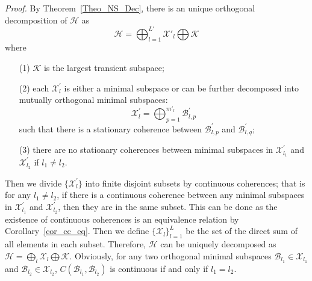 \documentclass[journal]{IEEEtran}
\def\h{\ensuremath{\mathcal{H}}}
\def\k{\ensuremath{\mathcal{K}}}
\def\x{\ensuremath{\mathcal{X}}}
\def\b{\ensuremath{\mathcal{B}}}
\def\k{\mathcal{K}}
\begin{document}
{\it Proof.} By Theorem~\ref{Theo_NS_Dec}, there is an unique  orthogonal decomposition of $\h$ as
  $$\h=\bigoplus_{l=1}^{L'}\x'_l\bigoplus \k$$
  where \begin{itemize}
    \item[(1)] $\k$ is the largest transient subspace;
    \item[(2)] each $\x_l^{'}$ is either a minimal subspace or can be further decomposed into mutually orthogonal minimal subspaces:
    $$\x_l^{'}=\bigoplus_{p=1}^{m'_l}\b_{l,p}^{'}$$%
    such that there is a stationary coherence between $\b_{l,p}^{'}$ and $\b_{l,q}^{'};$
    \item[(3)] there are no stationary coherences between minimal subspaces in $\x_{l_1}^{'}$ and $\x_{l_2}^{'}$ if $l_{1}\not =l_2.$
      \end{itemize}
Then we divide $\{\x_l^{'}\}$ into finite disjoint subsets by continuous coherences; that  is for any $l_1\not =l_2$, if there is a continuous coherence between any minimal subspaces in $\x_{l_1}^{'}$ and $\x_{l_2}^{'}$, then they are in the same subset. This can be done as the existence of continuous coherences is an equivalence relation by Corollary~\ref{cor_cc_eq}. Then we define $\{\x_l\}_{l=1}^{L}$ be the set of the direct sum  of all elements in each subset.  Therefore, $\h$ can be uniquely decomposed as $\h=\bigoplus_l\x_l\bigoplus \k.$ Obviously, for any two orthogonal  minimal subspaces $\b_{l_1}\in\x_{l_1}$ and $\b_{l_2}\in\x_{l_2}$, $C(\b_{l_1},\b_{l_2})$ is continuous if and only if $l_1=l_2.$
\end{document}
